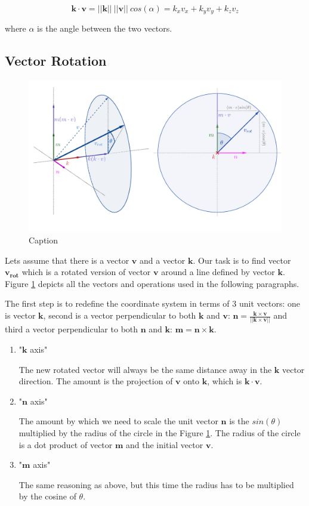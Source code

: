 $$\bm{k} \cdot \bm{v} = ||\bm{k}||~||\bm{v}||~cos(\alpha) = k_x v_x + k_y v_y + k_z v_z$$

where $\alpha$ is the angle between the two vectors.

\subsection{Vector Rotation}

\begin{figure}
    \centering
    \includegraphics[scale=3]{imgs_tomas/rodrigues_3d2d.png}
    \caption{Caption}
    \label{fig:rodrigues3d2d}
\end{figure}

Lets assume that there is a vector $\bm{v}$ and a vector $\bm{k}$. Our task is to find vector $\bm{v_{rot}}$ which is a rotated version of vector $\bm{v}$ around a line defined by vector $\bm{k}$. Figure \ref{fig:rodrigues3d2d} depicts all the vectors and operations used in the following paragraphs.

The first step is to redefine the coordinate system in terms of 3 unit vectors: one is vector $\bm{k}$, second is a vector perpendicular to both $\bm{k}$ and $\bm{v}$: $\bm{n} = \frac{\bm{k} \times \bm{v}}{||\bm{k} \times \bm{v}||}$ and third a vector perpendicular to both $\bm{n}$ and $\bm{k}$: $\bm{m} = \bm{n} \times \bm{k}$.

\begin{enumerate}
    \item "$\bm{k}$ axis"
    
    The new rotated vector will always be the same distance away in the $\bm{k}$ vector direction. The amount is the projection of $\bm{v}$ onto $\bm{k}$, which is $\bm{k} \cdot \bm{v}$.
    
    \item "$\bm{n}$ axis"
    
    The amount by which we need to scale the unit vector $\bm{n}$ is the $sin(\theta)$ multiplied by the radius of the circle in the Figure \ref{fig:rodrigues3d2d}. The radius of the circle is a dot product of vector $\bm{m}$ and the initial vector $\bm{v}$.
    \item "$\bm{m}$ axis"
    
    The same reasoning as above, but this time the radius has to be multiplied by the cosine of $\theta$.
\end{enumerate}

